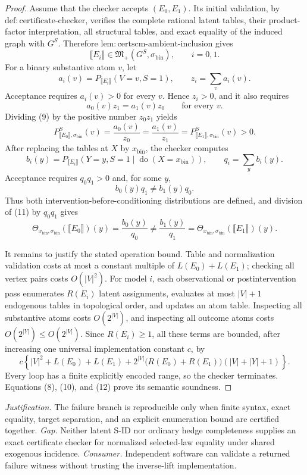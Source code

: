 \documentclass{article}
\begin{document}
\begin{proof}
Assume that the checker accepts \((E_0,E_1)\).  Its initial validation, by \(\mathrm{def:certificate\text{-}checker}\), verifies the complete rational latent tables, their product-factor interpretation, all structural tables, and exact equality of the induced graph with \(G^S\).  Therefore \(\mathrm{lem:certscm\text{-}ambient\text{-}inclusion}\) gives
\[
  \llbracket E_i\rrbracket\in\mathfrak M_+(G^S,\sigma_{\mathrm{bin}}),
  \qquad i=0,1. \tag{8}
\]
For a binary substantive atom \(v\), let
\[
 a_i(v)=P_{\llbracket E_i\rrbracket}(V=v,S=1),
 \qquad z_i=\sum_v a_i(v).
\]
Acceptance requires \(a_i(v)>0\) for every \(v\).  Hence \(z_i>0\), and it also requires
\[
 a_0(v)z_1=a_1(v)z_0\qquad\text{for every }v. \tag{9}
\]
Dividing (9) by the positive number \(z_0z_1\) yields
\[
 P^S_{\llbracket E_0\rrbracket,\sigma_{\mathrm{bin}}}(v)
 =\frac{a_0(v)}{z_0}
 =\frac{a_1(v)}{z_1}
 =P^S_{\llbracket E_1\rrbracket,\sigma_{\mathrm{bin}}}(v)>0. \tag{10}
\]
After replacing the tables at \(X\) by \(x_{\mathrm{bin}}\), the checker computes
\[
 b_i(y)=P_{\llbracket E_i\rrbracket}
   (Y=y,S=1\mid\operatorname{do}(X=x_{\mathrm{bin}})),
 \qquad q_i=\sum_y b_i(y).
\]
Acceptance requires \(q_0q_1>0\) and, for some \(y\),
\[
 b_0(y)q_1\ne b_1(y)q_0. \tag{11}
\]
Thus both intervention-before-conditioning distributions are defined, and division of (11) by \(q_0q_1\) gives
\[
 \Theta_{x_{\mathrm{bin}},\sigma_{\mathrm{bin}}}(\llbracket E_0\rrbracket)(y)
 =\frac{b_0(y)}{q_0}
 \ne\frac{b_1(y)}{q_1}
 =\Theta_{x_{\mathrm{bin}},\sigma_{\mathrm{bin}}}(\llbracket E_1\rrbracket)(y). \tag{12}
\]

It remains to justify the stated operation bound.  Table and normalization validation costs at most a constant multiple of \(L(E_0)+L(E_1)\); checking all vertex pairs costs \(O(|V|^2)\).  For model \(i\), each observational or postintervention pass enumerates \(R(E_i)\) latent assignments, evaluates at most \(|V|+1\) endogenous tables in topological order, and updates an atom table.  Inspecting all substantive atoms costs \(O(2^{|V|})\), and inspecting all outcome atoms costs \(O(2^{|Y|})\le O(2^{|V|})\).  Since \(R(E_i)\ge1\), all these terms are bounded, after increasing one universal implementation constant \(c\), by
\[
 c\left\{|V|^2+L(E_0)+L(E_1)
 +2^{|V|}\bigl(R(E_0)+R(E_1)\bigr)(|V|+|Y|+1)\right\}.
\]
Every loop has a finite explicitly encoded range, so the checker terminates.  Equations (8), (10), and (12) prove its semantic soundness.
\end{proof}
\par\smallskip\noindent \textit{Justification.} The failure branch is reproducible only when finite syntax, exact equality, target separation, and an explicit enumeration bound are certified together. \textit{Gap.} Neither latent S-ID nor ordinary hedge completeness supplies an exact certificate checker for normalized selected-law equality under shared exogenous incidence. \textit{Consumer.} Independent software can validate a returned failure witness without trusting the inverse-lift implementation.
\end{document}
